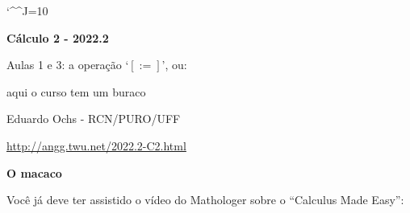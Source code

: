 \documentclass[oneside,12pt]{article}
\begin{document}
\catcode`\^^J=10
\pu
\def\pictgridstyle{\color{GrayPale}\linethickness{0.3pt}}
\def\pictaxesstyle{\linethickness{0.5pt}}
\def\pictnaxesstyle{\color{GrayPale}\linethickness{0.5pt}}
\celllower=2.5pt


\def\u#1{\par{\footnotesize \url{#1}}}

\def\drafturl{http://angg.twu.net/LATEX/2022-2-C2.pdf}
\def\drafturl{http://angg.twu.net/2022.2-C2.html}
\def\draftfooter{\tiny \href{\drafturl}{\jobname{}} \ColorBrown{\shorttoday{} \hours}}



%

\thispagestyle{empty}

\begin{center}

\vspace*{1.2cm}

{\bf \Large Cálculo 2 - 2022.2}

\bsk

Aulas 1 e 3: a operação `$[:=]$', ou:

aqui o curso tem um buraco

\bsk

Eduardo Ochs - RCN/PURO/UFF

\url{http://angg.twu.net/2022.2-C2.html}

\end{center}

\newpage


{\bf O macaco}

Você já deve ter assistido o vídeo do Mathologer sobre o ``Calculus
Made Easy'':
\end{document}
